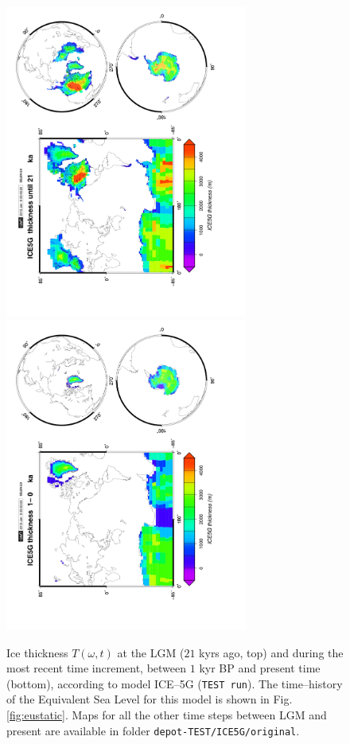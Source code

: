 \documentclass[11pt,fleqn,a4paper,titlepage]{article}
\begin{document}
\begin{figure}[h]
\begin{center}
\vspace{-1em}
\includegraphics[width=0.71\textwidth, angle=-90]{./Figures/mapice00.png}\vspace{-4em}
\includegraphics[width=0.71\textwidth, angle=-90]{./Figures/mapice21.png}\vspace{-2em}
\caption[Ice thickness distribution]{\small{Ice thickness $T(\omega,t)$ at the LGM ($21$ kyrs ago, top) and during the most recent 
time increment, between $1$ kyr BP and present time (bottom), according to model ICE--5G \citep{Peltier_2004} (\texttt{TEST run}). 
The time--history of the Equivalent Sea Level for this model is shown in Fig. \ref{fig:eustatic}. Maps
for all the other time steps between LGM and present are available in folder \texttt{depot-TEST/ICE5G/original}.}}
\label{fig:ice5g}
\end{center}
\end{figure}
\newpage
\end{document}
